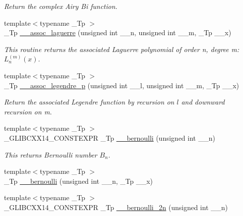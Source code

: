 \begin{DoxyCompactItemize}
\begin{DoxyCompactList}\small\item\em Return the complex Airy Bi function. \end{DoxyCompactList}\item 
{\footnotesize template$<$typename \+\_\+\+Tp $>$ }\\\+\_\+\+Tp \hyperlink{namespacestd_1_1____detail_a7d47c4512f7c6914f5504fde6ffa31fb}{\+\_\+\+\_\+assoc\+\_\+laguerre} (unsigned int \+\_\+\+\_\+n, unsigned int \+\_\+\+\_\+m, \+\_\+\+Tp \+\_\+\+\_\+x)
\begin{DoxyCompactList}\small\item\em This routine returns the associated Laguerre polynomial of order n, degree m\+: $ L_n^{(m)}(x) $. \end{DoxyCompactList}\item 
{\footnotesize template$<$typename \+\_\+\+Tp $>$ }\\\+\_\+\+Tp \hyperlink{namespacestd_1_1____detail_a8b31886e334427566b1b00d71052191b}{\+\_\+\+\_\+assoc\+\_\+legendre\+\_\+p} (unsigned int \+\_\+\+\_\+l, unsigned int \+\_\+\+\_\+m, \+\_\+\+Tp \+\_\+\+\_\+x)
\begin{DoxyCompactList}\small\item\em Return the associated Legendre function by recursion on $ l $ and downward recursion on m. \end{DoxyCompactList}\item 
{\footnotesize template$<$typename \+\_\+\+Tp $>$ }\\\+\_\+\+G\+L\+I\+B\+C\+X\+X14\+\_\+\+C\+O\+N\+S\+T\+E\+X\+PR \+\_\+\+Tp \hyperlink{namespacestd_1_1____detail_a68ae2aecb4cdf37b72cd60409cdc500c}{\+\_\+\+\_\+bernoulli} (unsigned int \+\_\+\+\_\+n)
\begin{DoxyCompactList}\small\item\em This returns Bernoulli number $ B_n $. \end{DoxyCompactList}\item 
{\footnotesize template$<$typename \+\_\+\+Tp $>$ }\\\+\_\+\+Tp \hyperlink{namespacestd_1_1____detail_a1171e65b7fb7712f0181fe7288acb343}{\+\_\+\+\_\+bernoulli} (unsigned int \+\_\+\+\_\+n, \+\_\+\+Tp \+\_\+\+\_\+x)
\item 
{\footnotesize template$<$typename \+\_\+\+Tp $>$ }\\\+\_\+\+G\+L\+I\+B\+C\+X\+X14\+\_\+\+C\+O\+N\+S\+T\+E\+X\+PR \+\_\+\+Tp \hyperlink{namespacestd_1_1____detail_abd0b1f05f2b32a21cad034b38473bb8b}{\+\_\+\+\_\+bernoulli\+\_\+2n} (unsigned int \+\_\+\+\_\+n)

\end{DoxyCompactItemize}
